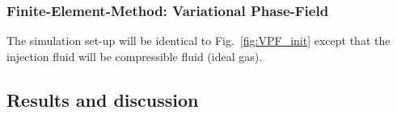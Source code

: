 \subsubsection*{Finite-Element-Method: Variational Phase-Field}

The simulation set-up will be identical to Fig.~\ref{fig:VPF_init} except that the injection fluid will be compressible fluid (ideal gas). 


\subsection{Results and discussion}
